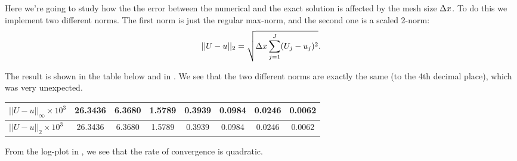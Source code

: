 \documentclass[11pt,letter, swedish, english
]{article}
\begin{document}
Here we're going to study how the the error between the numerical
and the exact solution is affected by the mesh size $\Delta{x}$. To do this
we implement two different norms. The first norm is just the regular
max-norm, and the second one is a scaled 2-norm:
\begin{equation}
||U-u||_2=\sqrt{\Delta{x}\sum_{j=1}^J(U_j-u_j)^2}.
\end{equation}

The result is shown in the table below and in . We see
that the two different norms are exactly the same (to the 4th decimal
place), which was very unexpected. 
\begin{center}
\begin{tabular}{|l|c|c|c|c|c|c|c|}\hline
$||U-u||_\infty\times10^3$&26.3436&6.3680&1.5789&0.3939&0.0984&0.0246&0.0062\\
\hline
$||U-u||_2\times10^3$&26.3436&6.3680&1.5789&0.3939&0.0984&0.0246&0.0062\\
\hline
\end{tabular}
\end{center}

From the log-plot in , we see that the rate of
convergence is quadratic.
\end{document}
